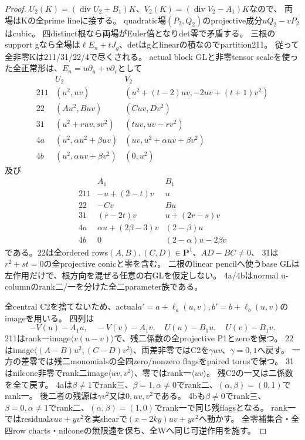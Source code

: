 \documentclass[a4paper,11pt]{ltjsarticle}
\theoremstyle{definition}
\newcommand{\PP}{\mathbf P}
\begin{document}
\begin{proof}
$U_2(K)=(\operatorname{div}U_2+B_1)K$、$V_2(K)=(\operatorname{div}V_2-A_1)K$なので、
両場はKの全prime lineに接する。
quadratic場$(P_2,Q_2)$のprojective成分$uQ_2-vP_2$はcubic。
四distinct根なら両場がEuler倍となりdet零で矛盾する。
三根のsupport gなら全場は$\ell E_n+tJ_g$、detはgとlinearの積なのでpartition211。
従って全非零Kは211/31/22/4で尽くされる。
actual block GLと非零tensor scaleを使った全正常形は、$E_n=u\partial_u+v\partial_v$として
\[
\begin{array}{c|c|c}
 &U_2&V_2\\\hline
 211&(u^2,uv)&(u^2+(t-2)uv,-2uv+(t+1)v^2)\\
 22&(Au^2,Buv)&(Cuv,Dv^2)\\
 31&(u^2+ruv,sv^2)&(tuv,uv-rv^2)\\
 4a&(u^2,\alpha u^2+\beta uv)&(uv,u^2+\alpha uv+\beta v^2)\\
 4b&(u^2,\alpha uv+\beta v^2)&(0,u^2)
\end{array}
\]
及び
\[
\begin{array}{c|c|c}
 &A_1&B_1\\\hline
 211&-u+(2-t)v&u\\
 22&-Cv&Bu\\
 31&(r-2t)v&u+(2r-s)v\\
 4a&\alpha u+(2\beta-3)v&(2-\beta)u\\
 4b&0&(2-\alpha)u-2\beta v
\end{array}
\]
である。22は全ordered rows$(A,B),(C,D)\in\PP^1$、$AD-BC\ne0$、
31は$r^2+st=0$の全projective conicと零を含む。
二根のlinear pencilへ使うbase GLは左作用だけで、根方向を混ぜる任意の右GLを仮定しない。
4a/4bはnormal u-columnのrank二/一を分けた全二parameter族である。

全central C2を捨てないため、actual$a'=a+\ell_a(u,v),b'=b+\ell_b(u,v)$のimageを用いる。
四列は
\[
 -V(u)-A_1u,\quad -V(v)-A_1v,\quad U(u)-B_1u,\quad U(v)-B_1v.
\]
211はrank一image$\langle v(u-v)\rangle$で、残二係数の全projective P1とzeroを保つ。
22はimage$\langle(A-B)u^2,(C-D)v^2\rangle$、両差非零ではC2を$\gamma uv$、$\gamma=0,1$へ戻す。
一方の差零では残二monomialsの全四zero/nonzero flagsをpaired torusで保つ。
31はnilcone非零でrank二image$\langle uv,v^2\rangle$、零ではrank一$\langle uv\rangle$。
残C2の一又は二係数を全て戻す。
4aは$\beta\ne1$でrank三、$\beta=1,\alpha\ne0$でrank二、$(\alpha,\beta)=(0,1)$でrank一。
後二者の残源は$\gamma v^2$又は$0,uv,v^2$である。
4bも$\beta\ne0$でrank三、$\beta=0,\alpha\ne1$でrank二、$(\alpha,\beta)=(1,0)$でrank一で同じ残flagsとなる。
rank一ではresidual$xuv+yv^2$を実shearで$(x-2ky)uv+yv^2$へ動かす。
全零補集合・全四row charts・nilconeの無限遠を保ち、全Wへ同じ可逆作用を施す。


\end{proof}
\end{document}
